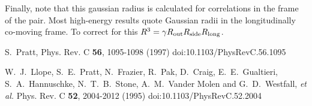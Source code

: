 Finally, note that this gaussian radius is calculated for correlations in the frame of the pair. Most high-energy results quote Gaussian radii in the longitudinally co-moving frame. To correct for this $R^3=\gamma R_{\rm out}R_{\rm side}R_{\rm long}$.

\begin{thebibliography}{99}

S.~Pratt,
Phys. Rev. C \textbf{56}, 1095-1098 (1997)
doi:10.1103/PhysRevC.56.1095

W.~J.~Llope, S.~E.~Pratt, N.~Frazier, R.~Pak, D.~Craig, E.~E.~Gualtieri, S.~A.~Hannuschke, N.~T.~B.~Stone, A.~M.~Vander Molen and G.~D.~Westfall, \textit{et al.}
Phys. Rev. C \textbf{52}, 2004-2012 (1995)
doi:10.1103/PhysRevC.52.2004

\end{thebibliography}


